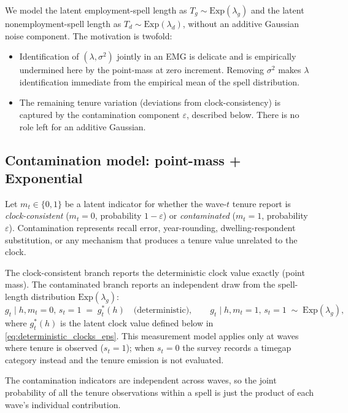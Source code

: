 \documentclass[12pt]{article}
\begin{document}
We model the latent employment-spell length as \(T_g \sim \mathrm{Exp}(\lambda_g)\)
and the latent nonemployment-spell length as \(T_d \sim \mathrm{Exp}(\lambda_d)\),
without an additive Gaussian noise component. The motivation is twofold:

\begin{itemize}
\item Identification of \((\lambda,\sigma^2)\) jointly in an EMG is delicate
  and is empirically undermined here by the point-mass at zero increment.
  Removing \(\sigma^2\) makes \(\lambda\) identification immediate from the
  empirical mean of the spell distribution.
\item The remaining tenure variation (deviations from clock-consistency)
  is captured by the contamination component \(\varepsilon\), described
  below. There is no role left for an additive Gaussian.
\end{itemize}

\subsection{Contamination model: point-mass + Exponential}

Let \(m_{t} \in \{0,1\}\) be a latent indicator for whether the wave-\(t\)
tenure report is \emph{clock-consistent}
(\(m_{t} = 0\), probability \(1-\varepsilon\)) or \emph{contaminated}
(\(m_{t} = 1\), probability \(\varepsilon\)). Contamination represents
recall error, year-rounding, dwelling-respondent substitution, or any
mechanism that produces a tenure value unrelated to the clock.

The clock-consistent branch reports the deterministic clock value exactly
(point mass). The contaminated branch reports an independent draw from the
spell-length distribution \(\mathrm{Exp}(\lambda_g)\):
\begin{equation}
g_{t} \mid h, m_{t}=0,\, s_{t}=1 \;=\; g^*_{t}(h) \quad\text{(deterministic)},
\qquad
g_{t} \mid h, m_{t}=1,\, s_{t}=1 \;\sim\; \mathrm{Exp}(\lambda_g),
\label{eq:eps_branch}
\end{equation}
where \(g^*_{t}(h)\) is the latent clock value defined below in
\eqref{eq:deterministic_clocks_eps}. This measurement model applies only
at waves where tenure is observed (\(s_{t}=1\)); when \(s_{t}=0\) the
survey records a timegap category instead and the tenure emission is not
evaluated.

The contamination indicators are independent across waves, so the joint 
probability of all the tenure observations within a spell is just the 
product of each wave's individual contribution.
\end{document}
